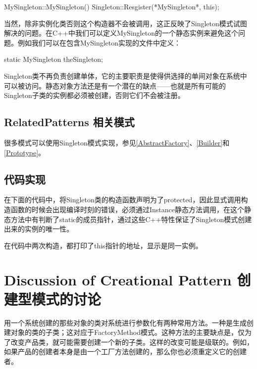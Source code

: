 \begin{itemize}
\begin{schemedisplay}

MySingleton::MySingleton(){
	Singleton::Resgister(*MySingleton*, this);
}

\end{schemedisplay}

	当然，除非实例化类否则这个构造器不会被调用，这正反映了Singleton模式试图解决的问题。在C++中我们可以定义MySingleton的一个静态实例来避免这个问题。例如我们可以在包含MySingleton实现的文件中定义：

\begin{schemedisplay}

static MySingleton theSingleton;

\end{schemedisplay}

    Singleton类不再负责创建单体，它的主要职责是使得供选择的单间对象在系统中可以被访问。静态对象方法还是有一个潜在的缺点——也就是所有可能的Singleton子类的实例都必须被创建，否则它们不会被注册。


\subsection{RelatedPatterns 相关模式}

很多模式可以使用Singleton模式实现，参见\ref{AbstractFactory}、\ref{Builder}和\ref{Prototype}。

\subsection{代码实现}

在下面的代码中，将Singleton类的构造函数声明为了protected，因此显式调用构造函数的时候会出现编译时刻的错误，必须通过Instance静态方法调用，在这个静态方法中有判断了static的成员指针，通过这些C++特性保证了Singleton模式创建出来的实例的唯一性。

在代码中两次构造，都打印了this指针的地址，显示是同一实例。



\section{Discussion of Creational Pattern 创建型模式的讨论}

用一个系统创建的那些对象的类对系统进行参数化有两种常用方法。一种是生成创建对象的类的子类；这对应于FactoryMethod模式。这种方法的主要缺点是，仅为了改变产品类，就可能需要创建一个新的子类。这样的改变可能是级联的。例如，如果产品的创建者本身是由一个工厂方法创建的，那么你也必须重定义它的创建者。


\end{itemize}
